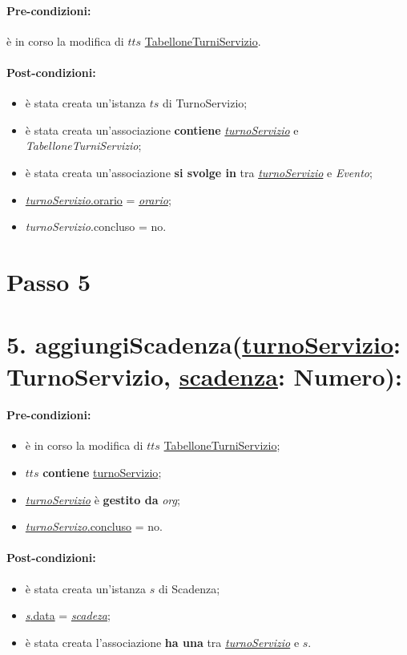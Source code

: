 \paragraph{Pre-condizioni:}
 \item è in corso la modifica di $tts$ \underline{TabelloneTurniServizio}.

\paragraph{Post-condizioni:}
\begin{itemize}
   \item è stata creata un'istanza $ts$ di TurnoServizio;
    \item è stata creata un'associazione \textbf{contiene} \underline{\textit{turnoServizio}} e \textit{TabelloneTurniServizio};
   \item è stata creata un'associazione \textbf{si svolge in} tra \underline{\textit{turnoServizio}} e \textit{Evento};
    \item \underline{\textit{turnoServizio}.orario} = \underline{\textit{orario}};
    \item \textit{turnoServizio}.concluso  = no.
\end{itemize}


\section{Passo 5}
\section*{5. aggiungiScadenza(\underline{turnoServizio}: TurnoServizio, \underline{scadenza}: Numero):}

\paragraph{Pre-condizioni:}
\begin{itemize}
\item è in corso la modifica di $tts$ \underline{TabelloneTurniServizio};
 \item $tts$ \textbf{contiene} \underline{turnoServizio};
     \item \underline{\textit{turnoServizio}} è \textbf{gestito da} {\textit{org}};
   \item \underline{\textit{turnoServizo}.concluso} = no.
\end{itemize}

\paragraph{Post-condizioni:}  
\begin{itemize}
 \item è stata creata un'istanza $s$ di Scadenza;
 \item \underline{\textit{s}.data} = \underline{\textit{scadeza}};
 \item è stata creata l'associazione \textbf{ha una} tra \underline{\textit{turnoServizio}} e $s$.
\end{itemize}

